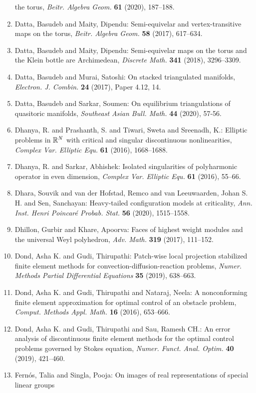 \begin{enumerate}
the torus, \emph{Beitr. Algebra Geom.} {\bf 61} (2020), 187--188.
\item Datta, Basudeb and Maity, Dipendu: Semi-equivelar and vertex-transitive maps on the torus, \emph{Beitr. Algebra Geom.} {\bf 58} (2017), 617--634.
\item Datta, Basudeb and Maity, Dipendu: Semi-equivelar maps on the torus and the {K}lein bottle are
{A}rchimedean, \emph{Discrete Math.} {\bf 341} (2018), 3296--3309.
\item Datta, Basudeb and Murai, Satoshi: On stacked triangulated manifolds, \emph{Electron. J. Combin.} {\bf 24} (2017), Paper 4.12, 14.
\item Datta, Basudeb and Sarkar, Soumen: On equilibrium triangulations of quasitoric manifolds, \emph{Southeast Asian Bull. Math.} {\bf 44} (2020), 57-56.
\item Dhanya, R. and Prashanth, S. and Tiwari, Sweta and Sreenadh,
K.: Elliptic problems in {${\Bbb R}^N$} with critical and singular
discontinuous nonlinearities, \emph{Complex Var. Elliptic Equ.} {\bf 61} (2016), 1668--1688.
\item Dhanya, R. and Sarkar, Abhishek: Isolated singularities of polyharmonic operator in even
dimension, \emph{Complex Var. Elliptic Equ.} {\bf 61} (2016), 55--66.
\item Dhara, Souvik and van der Hofstad, Remco and van Leeuwaarden,
Johan S. H. and Sen, Sanchayan: Heavy-tailed configuration models at criticality, \emph{Ann. Inst. Henri Poincar\'{e} Probab. Stat.} {\bf 56} (2020), 1515--1558.
\item Dhillon, Gurbir and Khare, Apoorva: Faces of highest weight modules and the universal {W}eyl
polyhedron, \emph{Adv. Math.} {\bf 319} (2017), 111--152.
\item Dond, Asha K. and Gudi, Thirupathi: Patch-wise local projection stabilized finite element methods
for convection-diffusion-reaction problems, \emph{Numer. Methods Partial Differential Equations} {\bf 35} (2019), 638--663.
\item Dond, Asha K. and Gudi, Thirupathi and Nataraj, Neela: A nonconforming finite element approximation for optimal
control of an obstacle problem, \emph{Comput. Methods Appl. Math.} {\bf 16} (2016), 653--666.
\item Dond, Asha K. and Gudi, Thirupathi and Sau, Ramesh CH.: An error analysis of discontinuous finite element methods for
the optimal control problems governed by {S}tokes equation, \emph{Numer. Funct. Anal. Optim.} {\bf 40} (2019), 421--460.
\item Fern\'{o}s, Talia and Singla, Pooja: On images of real representations of special linear groups

\end{enumerate}
